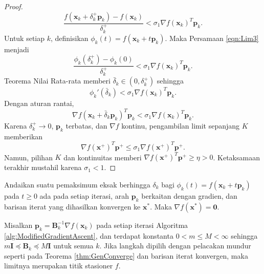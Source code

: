 \begin{proof}
\begin{equation}
\frac{f(\mathbf{x}_k+\delta_k^+\mathbf{p}_k)-f(\mathbf{x}_k)}{\delta_k^+}
<\sigma_1\nabla f(\mathbf{x}_k)^T\mathbf{p}_k.
\label{eqn:Lim3}
\end{equation}
Untuk setiap $k$, definisikan $\phi_k(t)=f(\mathbf{x}_k+t\mathbf{p}_k)$. Maka Persamaan \ref{eqn:Lim3} menjadi
\begin{equation}
\frac{\phi_k(\delta_k^+)-\phi_k(0)}{\delta_k^+}
<\sigma_1\nabla f(\mathbf{x}_k)^T\mathbf{p}_k.
\label{eqn:Lim4}
\end{equation}
Teorema Nilai Rata-rata memberi $\bar\delta_k\in(0,\delta_k^+)$ sehingga
\begin{equation}
\phi_k'(\bar\delta_k)
<\sigma_1\nabla f(\mathbf{x}_k)^T\mathbf{p}_k.
\label{eqn:Lim5}
\end{equation}
Dengan aturan rantai,
\begin{equation}
\nabla f(\mathbf{x}_k+\bar\delta_k\mathbf{p}_k)^T\mathbf{p}_k
<\sigma_1\nabla f(\mathbf{x}_k)^T\mathbf{p}_k.
\end{equation}
Karena $\delta_k^+\to0$, $\mathbf{p}_k$ terbatas, dan $\nabla f$ kontinu, pengambilan limit sepanjang $K$ memberikan
\begin{equation}
\nabla f(\mathbf{x}^+)^T\mathbf{p}^+
\leq\sigma_1\nabla f(\mathbf{x}^+)^T\mathbf{p}^+.
\end{equation}
Namun, pilihan $K$ dan kontinuitas memberi $\nabla f(\mathbf{x}^+)^T\mathbf{p}^+\geq\eta>0$. Ketaksamaan terakhir mustahil karena $\sigma_1<1$.
\end{proof}

\begin{corollary}
\label{cor:MinArmijo}
Andaikan suatu pemaksimum eksak berhingga $\delta_k$ bagi $\phi_k(t)=f(\mathbf{x}_k+t\mathbf{p}_k)$ pada $t\geq0$ ada pada setiap iterasi, arah $\mathbf{p}_k$ berkaitan dengan gradien, dan barisan iterat yang dihasilkan konvergen ke $\mathbf{x}^*$. Maka $\nabla f(\mathbf{x}^*)=\mathbf{0}$.
\end{corollary}
\begin{corollary}
\label{cor:SymmetricPDConverge}
Misalkan $\mathbf{p}_k=\mathbf{B}_k^{-1}\nabla f(\mathbf{x}_k)$ pada setiap iterasi Algoritma \ref{alg:ModifiedGradientAscent}, dan terdapat konstanta $0<m\leq M<\infty$ sehingga $m\mathbf{I}\preceq\mathbf{B}_k\preceq M\mathbf{I}$ untuk semua $k$. Jika langkah dipilih dengan pelacakan mundur seperti pada Teorema \ref{thm:GenConverge} dan barisan iterat konvergen, maka limitnya merupakan titik stasioner $f$.
\end{corollary}

